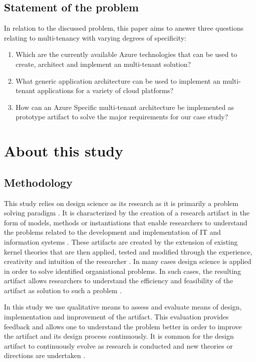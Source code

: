 \subsection{Statement of the problem}
In relation to the discussed problem, this paper aims to answer three questions relating to multi-tenancy with varying degrees of specificity:
\begin{enumerate}
\item Which are the currently available Azure technologies that can be used to create, architect and implement an multi-tenant solution?
\item What generic application architecture can be used to implement an multi-tenant applications for a variety of cloud platforms?
\item How can an Azure Specific multi-tenant architecture be implemented as prototype artifact to solve the major requirements for our case study?
\end{enumerate}

\section{About this study}
\subsection{Methodology}
This study relies on design science as its research as it is primarily a problem solving paradigm \cite{Hevner2004a}. It is characterized by the creation of a research artifact in the form of models, methods or instantiations that enable researchers to understand the problems related to the development and implementation of IT and information systems \cite{March1995a}. These artifacts are created by the extension of existing kernel theories that are then applied, tested and modified through the experience, creativity and intuition of the researcher \cite{Walls1992}. In many cases design science is applied in order to solve identified organiational problems. In such cases, the resulting artifact allows researchers to understand the efficiency and feasibility of the artifact as solution to such a problem \cite{Hevner2004a}. 

In this study we use qualitative means to assess and evaluate means of design, implementation and improvement of the artifact.  This evaluation provides feedback and allows one to understand the problem better in order to improve the artifact and its design process continuously. It is common for the design artifact to continuously evolve as research is conducted and new theories or directions are undertaken \cite{Hevner2004a}. 

